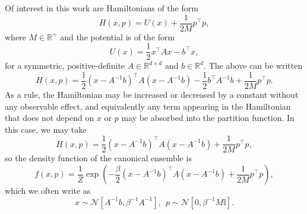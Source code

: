 \documentclass[prx,onecolumn,floatfix,longbibliography,notitlepage, nofootinbib,12pt]{revtex4-2}
\begin{document}
\begin{appendix}
Of interest in this work are Hamiltonians of the form
\begin{equation}
    H(x,p) = U(x) + \frac{1}{2M} p^\intercal p,
\end{equation}
where $M\in \mathbb{R}^+$ and the potential is of the form
\begin{equation}
\label{eq:full-potential}
U(x) = \frac{1}{2} x^\intercal A x - b^\intercal x,
\end{equation}
for a symmetric, positive-definite $A\in \mathbb{R}^{d\times d}$ and $b\in \mathbb{R}^d$. The above can be written
\begin{equation}
\label{eq:full-hamiltonian}
    H(x,p) = \frac{1}{2}(x - A^{-1}b)^\intercal A(x - A^{-1} b) - \frac{1}{2}b^\intercal A^{-1} b + \frac{1}{2M}p^\intercal p.
\end{equation}
As a rule, the Hamiltonian may be increased or decreased by a constant without any observable effect, and equivalently any term appearing in the Hamiltonian that does not depend on $x$ or $p$ may be absorbed into the partition function. In this case, we may take
\begin{equation}
\label{eq:full-hamiltonian-shifted}
   H(x,p) = \frac{1}{2}(x - A^{-1} b)^\intercal A(x - A^{-1} b)+\frac{1}{2M}p^\intercal p,
\end{equation}
so the density function of the canonical ensemble is
\begin{equation}
f(x,p) = \frac{1}{Z}\exp \left( -\frac{\beta}{2}(x - A^{-1} b)^\intercal A(x - A^{-1} b) + \frac{1}{2M} p^\intercal p \right),
\end{equation}
which we often write as
\begin{equation}
\label{eq:full-hamiltonian-gibbs-dist}
    x \sim \mathcal{N}[A^{-1}b, \beta^{-1}A^{-1}], \: \: p \sim  \mathcal{N}\left[0, \beta^{-1} M \mathbb{I}\right].
\end{equation}




\end{appendix}
\end{document}
